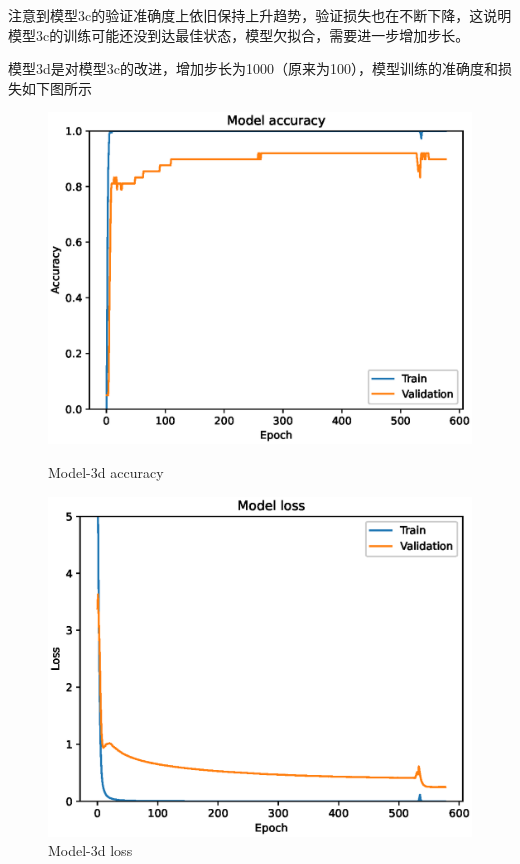 注意到模型3c的验证准确度上依旧保持上升趋势，验证损失也在不断下降，这说明模型3c的训练可能还没到达最佳状态，模型欠拟合，需要进一步增加步长。

模型3d是对模型3c的改进，增加步长为1000（原来为100），模型训练的准确度和损失如下图所示

\begin{figure}
        \centering
        \begin{minipage}{0.45\textwidth}
            \centering
            \includegraphics[width=\textwidth]{./fig/model3/accuracy3d.eps}
            \caption{Model-3d accuracy}
            \label{fig:model3d_acc}
        \end{minipage}
        \begin{minipage}{0.45\textwidth}
            \centering
            \includegraphics[width=\textwidth]{./fig/model3/loss3d.eps}
            \caption{Model-3d loss}
            \label{fig:model3d_loss}
        \end{minipage}
\end{figure}

